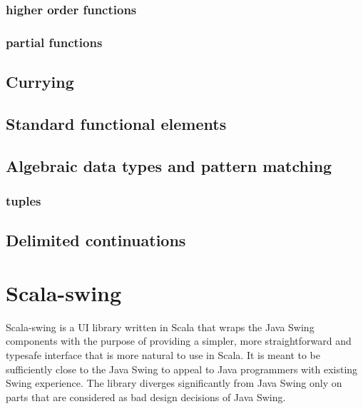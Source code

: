 \subsubsection{higher order functions}
\subsubsection{partial functions}

\subsection{Currying}

\subsection{Standard functional elements}

\subsection{Algebraic data types and pattern matching}

\subsubsection{tuples}

\subsection{Delimited continuations}




\section{Scala-swing}

Scala-swing is a UI library written in Scala that wraps the Java Swing components with the purpose of providing a simpler, more straightforward and typesafe interface that is more natural to use in Scala. It is meant to be sufficiently close to the Java Swing to appeal to Java programmers with existing Swing experience.\cite{ScalaSwing} The library diverges significantly from Java Swing only on parts that are considered as bad design decisions of Java Swing.


